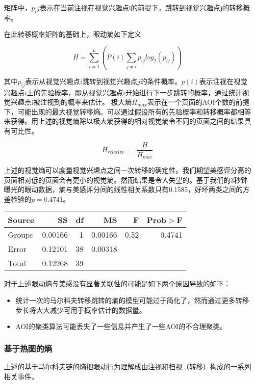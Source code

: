 矩阵中，$p_ij$表示在当前注视在视觉兴趣点i的前提下，跳转到视觉兴趣点j的转移概率。

在此转移概率矩阵的基础上，眼动熵如下定义

$$H = \sum_{i=1}^n(P(i)\sum_{j\neq i} p_{ij}log_2(p_{ij}))$$

其中$p_{ij}$表示从视觉兴趣点$i$跳转到视觉兴趣点$j$的条件概率。$p(i)$表示注视在视觉兴趣点$i$上的先验概率，即从视觉兴趣点$i$开始进行下一步跳转的概率，通过统计视觉兴趣点i被注视到的概率来估计。
极大熵$H_{max}$表示在一个页面的AOI个数的前提下，可能出现的最大视觉转移熵。可以通过假设所有的先验概率和转移概率都相等来获得。用上述的视觉熵除以极大熵获得的相对视觉熵令不同的页面之间的结果具有可比性。

$$H_{relative}~=~\frac{H}{H_{max}}$$

上述的视觉熵可以度量视觉兴趣点之间一次转移的确定性。我们期望美感评分高的页面相对低的页面会有更小的视觉熵。然而结果是令人失望的。基于我们的3秒钟曝光的眼动数据，熵与美感评分间的线性相关系数只有0.1585，好坏两类之间的方差检验的$p=0.4741$。

\begin{table}[H]
\centering
\begin{tabular}{lrrrrr}
  \hline
  Source&SS&df&MS&F&Prob$>$F\\ \hline
  Groups&0.00166&1&0.00166&0.52&0.4741\\
  Error&0.12101&38&0.00318&&\\
  Total&0.12268&39&&&\\
  \hline
\end{tabular}
\end{table}

对于上述眼动熵与美感没有显著关联性的可能是如下两个原因导致的如下：

\begin{itemize}
  \item 统计一次的马尔科夫转移跳转的熵的模型可能过于简化了，然而通过更多转移步长将大大减少可用于概率估计的数据量。
  \item AOI的聚类算法可能丢失了一些信息并产生了一些AOI的不合理聚类。
\end{itemize}

\subsubsection{基于热图的熵}
上述的基于马尔科夫链的熵把眼动行为理解成由注视和扫视（转移）构成的一系列相关事件。

